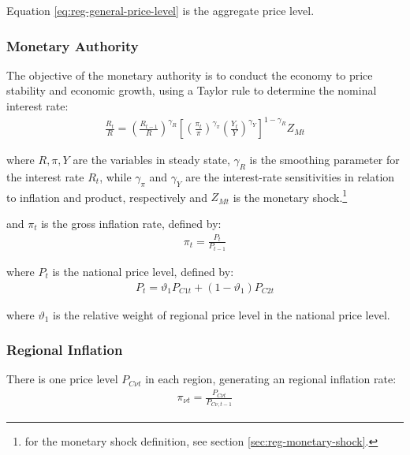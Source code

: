\documentclass[
	thesis.tex
	]{subfiles}
\begin{document}
Equation \ref{eq:reg-general-price-level} is the aggregate price level.


\subsubsection{Monetary Authority}

The objective of the monetary authority is to conduct the economy to price stability and economic growth, using a Taylor rule \cite{taylor_discretion_1993} to determine the nominal interest rate:
\begin{align}
	\label{eq:reg-monetary-policy}
	\frac{R_t}{R} =
	\left( \frac{R_{t-1}}{R} \right)^{\gamma_R}  \left[
	\left( \frac{\pi_t}{\pi} \right)^{\gamma_\pi}
	\left( \frac{Y_t}{Y} \right)^{\gamma_Y} \right]^{1-\gamma_R} Z_{Mt}
\end{align}

where $R, \pi, Y$ are the variables in steady state, $\gamma_R$ is the smoothing parameter for the interest rate $R_t$, while $\gamma_\pi$ and $\gamma_Y$ are the interest-rate sensitivities in relation to inflation and product, respectively and $Z_{Mt}$ is the monetary shock.\footnote{for the monetary shock definition, see section \ref{sec:reg-monetary-shock}.}

and $\pi_t$ is the gross inflation rate, defined by:
\begin{align}
	\pi_t = \frac{P_t}{P_{t-1}}
	\label{eq:reg-gross-inflation-rate}
\end{align}

where $P_t$ is the national price level, defined by:
\begin{align}
	P_t = \vartheta_1 P_{C1 t} + (1 -\vartheta_1) P_{C2 t}
	\label{eq:national-price-level}
\end{align}

where $\vartheta_1$ is the relative weight of regional price level in the national price level.

\subsubsection*{Regional Inflation}

There is one price level $P_{C\nu t}$ in each region, generating an regional inflation rate:
\begin{align}
	\pi_{\nu t} = \frac{P_{C\nu t}}{P_{C\nu, t-1}} \label{eq:regional-inflation}
\end{align}
\end{document}
